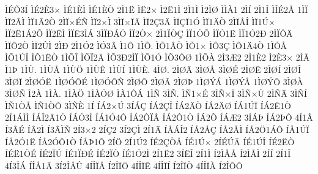 {^^cc^^c9^^d53^^cd
^^cc^^c92^^c83^^d7
^^cc^^c91^^c8^^cc
^^cc^^c91^^c8^^d2
2^^cc1^^cb
^^cc^^cb2^^d7
^^cc2^^cb1^^cc
2^^cc1^^cc
^^cc2^^cc^^d8
^^cc^^cc^^c01
2^^cc^^cd
2^^cc1^^ce
^^cc^^ce^^c92^^c5
1^^cc^^cf
^^cc^^cf2^^c2^^cc
^^cc^^cf1^^c22^^d2
2^^cc^^cf^^d7^^c9^^d1
^^cc^^cf2^^d7^^cc
3^^cc^^cf^^d7^^cf^^c4
^^cc^^cf2^^c73^^c4
^^cc^^cf^^c7^^cf1^^d3
^^cc^^cf1^^c4^^d2
2^^cc^^cf^^c5^^ce
^^cc^^cf1^^da^^d7
^^cc^^cf2^^cb1^^c12^^d5
^^cc^^cf2^^cb^^cc
^^cc^^cf^^cb3^^cc^^c1
3^^cc^^cf^^d0^^c1^^d3
^^cc^^cf2^^d2^^d7
2^^cc1^^cf^^d2^^c7
^^cc^^cf1^^d2^^d5
^^cc^^cf^^d31^^cb
^^cc^^cf1^^d32^^d0
2^^cc^^cf^^d4^^c4
^^cc^^cf^^d42^^d2
^^cc^^cf2^^db^^cc
2^^cc^^d0
2^^cc1^^d32
^^cc^^d33^^c2
^^cc1^^d4
1^^cc^^d5.
^^cc^^d51^^c2^^d2
^^cc^^d51^^d7
^^cc^^d53^^c7
^^cc^^d51^^c44^^d2
1^^cc^^d5^^c5
^^cc^^d51^^da^^ce
^^cc^^d51^^cb^^d2
1^^cc^^d5^^ce
^^cc^^d5^^cf2^^c4
^^cc^^d53^^d02^^cc^^cf
^^cc^^d51^^d3
^^cc^^d53^^d4^^d8
1^^cc^^d5^^c0
2^^cc3^^c62
2^^cc1^^c82
^^cc2^^c83^^d7
2^^cc^^c3
^^cc1^^de
1^^cc^^d9.
1^^cc^^d9^^c5
1^^cc^^d9^^d6
1^^cc^^d9^^ca
1^^cc^^d9^^cd
1^^cc^^d9^^c8.
4^^cc^^d8.
2^^cc^^d8^^c4
3^^cc^^d8^^c5
3^^cc^^d8^^c9
2^^cc^^d8^^cb
2^^cc^^d8^^cd
2^^cc^^d8^^ce
3^^cc^^d8^^cf
2^^cc^^d8^^d3^^cb
1^^cc^^d8^^d3^^d4^^c9
1^^cc^^d8^^d3^^d4^^d1
2^^cc^^d8^^d4
2^^cc^^d8^^c3
2^^cc^^d8^^de
1^^cc^^d8^^dd^^c1
1^^cc^^d8^^dd^^c5
1^^cc^^d8^^dd^^d5
3^^cc^^d8^^c0
3^^cc^^d8^^d1
^^cc2^^c0
1^^cc^^c0.
1^^cc^^c0^^d6
1^^cc^^c0^^d3^^d8
^^cc^^c01^^d4^^c1
1^^cc^^d1
3^^cc^^d1.
^^cc^^d11^^d7^^c9
3^^cc^^d1^^d7^^cf
3^^cc^^d1^^d7^^d9
2^^cc^^d1^^c4
3^^cc^^d1^^cd
^^cc^^d11^^d2^^c5
^^cc^^d11^^d2^^d5
3^^cc^^d1^^c8
1^^cd
^^cd^^c12^^d7^^da
3^^cd^^c1^^c7
^^cd^^c12^^c7^^ce
^^cd^^c12^^c4^^d2
^^cd^^c12^^c4^^d8
^^cd^^c11^^da^^cf
^^cd^^c12^^cb1^^d2
2^^cd1^^c1^^cc^^cc
^^cd^^c1^^ce2^^c41^^d2
^^cd^^c1^^d33^^cc
^^cd^^c11^^d34^^d4
^^cd^^c12^^d4^^cf^^c2
^^cd^^c12^^d41^^d2
^^cd^^c12^^d5
^^cd^^c1^^c62
3^^cd^^c1^^de
^^cd^^c12^^de^^d4
4^^cd1^^c2
^^cd3^^c2^^c9
^^cd^^c22^^cc
^^cd3^^c2^^cc^^d1
2^^cd3^^d72
2^^cd^^c72
3^^cd2^^c7^^cc
2^^cd1^^c4
^^cd^^c5^^c1^^ce2
^^cd^^c52^^c5^^c7
^^cd^^c52^^c5^^cc
^^cd^^c52^^d61^^c1^^d4
^^cd^^c51^^da^^cf
^^cd^^c52^^d31^^cb
^^cd^^c52^^d3^^d41^^d2
^^cd^^c5^^de1^^d4
2^^cd^^d6
2^^cd1^^da2
^^cd^^c92^^c7^^d2^^c5
^^cd^^c91^^da^^d7
2^^cd^^c9^^da^^c4
^^cd^^c91^^da^^ce
^^cd^^c92^^cb^^d2
^^cd^^c9^^cb1^^d2^^c9
^^cd^^c92^^cf^^da
^^cd^^c91^^cf^^d0^^c9
^^cd^^c92^^cf^^d2
^^cd^^c91^^d32^^cc
2^^cd1^^cb2
3^^cd^^cb^^ce
2^^cd1^^cc
^^cd2^^cc^^c5^^c5
^^cd2^^cc^^c5^^cc
2^^cd^^cd
2^^cd1^^ce
4^^cd3^^ce^^c1
^^cd^^ce^^c51^^c4
3^^cd2^^ce^^c5^^db
4^^cd^^ce^^cf^^c5
^^cd2^^ce^^cf^^d6
4^^cd^^ce^^cf^^ca
4^^cd^^ce^^cf^^cd
^^cd2^^ce^^cf^^d2
4^^cd^^ce^^cf^^c0
^^cd2^^ce^^d5^^d4
}
